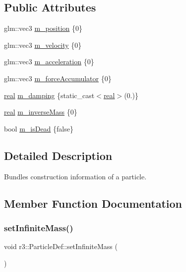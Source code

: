\subsection*{Public Attributes}
\begin{DoxyCompactItemize}
\item 
glm\+::vec3 \mbox{\hyperlink{structr3_1_1_particle_def_ac608a2d4c722142aa767187ca2f0dc3e}{m\+\_\+position}} \{0\}
\item 
glm\+::vec3 \mbox{\hyperlink{structr3_1_1_particle_def_a0c69fb8b0e2994e5ff24aa1156bdb5fd}{m\+\_\+velocity}} \{0\}
\item 
glm\+::vec3 \mbox{\hyperlink{structr3_1_1_particle_def_a231397eab290672708245641223a7cc9}{m\+\_\+acceleration}} \{0\}
\item 
glm\+::vec3 \mbox{\hyperlink{structr3_1_1_particle_def_a4b27ae926a85c8453a5e33ad64fc5c72}{m\+\_\+force\+Accumulator}} \{0\}
\item 
\mbox{\hyperlink{namespacer3_ab2016b3e3f743fb735afce242f0dc1eb}{real}} \mbox{\hyperlink{structr3_1_1_particle_def_a76008c519d8c2fd21b7c866708dceb5c}{m\+\_\+damping}} \{static\+\_\+cast$<$\mbox{\hyperlink{namespacer3_ab2016b3e3f743fb735afce242f0dc1eb}{real}}$>$(0.)\}
\item 
\mbox{\hyperlink{namespacer3_ab2016b3e3f743fb735afce242f0dc1eb}{real}} \mbox{\hyperlink{structr3_1_1_particle_def_a7ae250681e8ce19b47d642195bb328b4}{m\+\_\+inverse\+Mass}} \{0\}
\item 
bool \mbox{\hyperlink{structr3_1_1_particle_def_a76af421a2ee1f9f3c82bdc388f71d1ba}{m\+\_\+is\+Dead}} \{false\}
\end{DoxyCompactItemize}


\subsection{Detailed Description}
Bundles construction information of a particle. 

\subsection{Member Function Documentation}
\mbox{\label{structr3_1_1_particle_def_a779364b02815c9e4ea30678ea4031445}} 
\subsubsection{\texorpdfstring{set\+Infinite\+Mass()}{setInfiniteMass()}}
{\footnotesize\ttfamily void r3\+::\+Particle\+Def\+::set\+Infinite\+Mass (\begin{DoxyParamCaption}{ }\end{DoxyParamCaption})}

